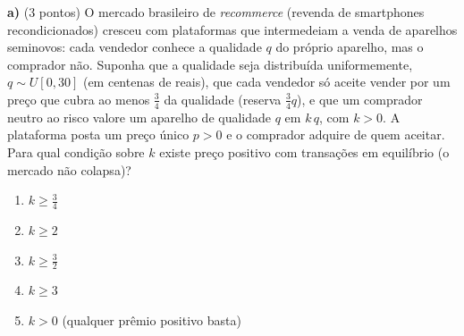 \textbf{a)} (3 pontos) O mercado brasileiro de \emph{recommerce} (revenda de smartphones recondicionados) cresceu com plataformas que intermedeiam a venda de aparelhos seminovos: cada vendedor conhece a qualidade $q$ do pr\'oprio aparelho, mas o comprador n\~ao. Suponha que a qualidade seja distribu\'ida uniformemente, $q \sim U[0,30]$ (em centenas de reais), que cada vendedor s\'o aceite vender por um pre\c{c}o que cubra ao menos $\tfrac{3}{4}$ da qualidade (reserva $\tfrac{3}{4}q$), e que um comprador neutro ao risco valore um aparelho de qualidade $q$ em $k\,q$, com $k>0$. A plataforma posta um pre\c{c}o \'unico $p>0$ e o comprador adquire de quem aceitar. Para qual condi\c{c}\~ao sobre $k$ existe pre\c{c}o positivo com transa\c{c}\~oes em equil\'ibrio (o mercado n\~ao colapsa)?

\begin{enumerate}[label=\Alph*., leftmargin=3.2em, itemsep=0.15em, topsep=0.2em]
  \item $k \ge \tfrac{3}{4}$
  \item $k \ge 2$
  \item $k \ge \tfrac{3}{2}$
  \item $k \ge 3$
  \item $k > 0$ (qualquer pr\^emio positivo basta)
\end{enumerate}
